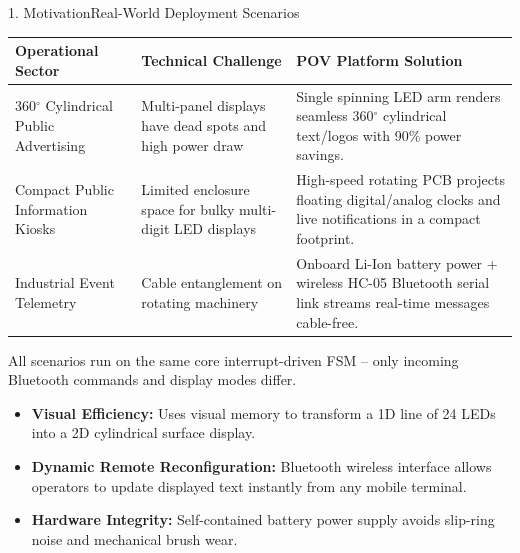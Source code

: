 \documentclass[aspectratio=169, 10pt]{beamer}
\begin{document}
\begin{frame}{1. Motivation}{Real-World Deployment Scenarios}
    \tiny
    \begin{table}
        \centering
        \begin{tabular}{p{2.7cm} p{3.0cm} p{5.3cm}}
            \toprule
            \textbf{\color{Accent} Operational Sector} & \textbf{\color{Accent} Technical Challenge} & \textbf{\color{Accent} POV Platform Solution} \\
            \midrule
            360$^\circ$ Cylindrical Public Advertising & Multi-panel displays have dead spots and high power draw & Single spinning LED arm renders seamless 360$^\circ$ cylindrical text/logos with 90\% power savings. \\
            Compact Public Information Kiosks & Limited enclosure space for bulky multi-digit LED displays & High-speed rotating PCB projects floating digital/analog clocks and live notifications in a compact footprint. \\
            Industrial Event Telemetry & Cable entanglement on rotating machinery & Onboard Li-Ion battery power + wireless HC-05 Bluetooth serial link streams real-time messages cable-free. \\
            \bottomrule
        \end{tabular}
    \end{table}
    \vspace{0.1cm}
    {\tiny\color{TextDim} All scenarios run on the same core interrupt-driven FSM -- only incoming Bluetooth commands and display modes differ.}
    \vspace{0.1cm}
    \footnotesize
    \begin{itemize}
        \item \textbf{Visual Efficiency:} Uses visual memory to transform a 1D line of 24 LEDs into a 2D cylindrical surface display.
        \item \textbf{Dynamic Remote Reconfiguration:} Bluetooth wireless interface allows operators to update displayed text instantly from any mobile terminal.
        \item \textbf{Hardware Integrity:} Self-contained battery power supply avoids slip-ring noise and mechanical brush wear.
    \end{itemize}
\end{frame}
\end{document}
